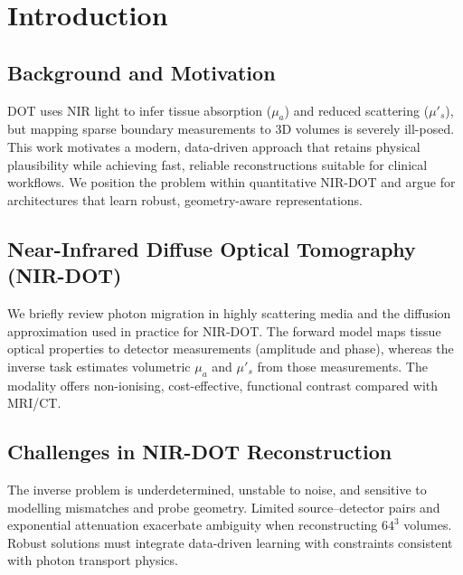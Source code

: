 
\chapter{Introduction}

\section{Background and Motivation}

DOT uses NIR light to infer tissue absorption ($\mu_a$) and reduced scattering ($\mu'_s$), but mapping sparse boundary measurements to 3D volumes is severely ill-posed. This work motivates a modern, data-driven approach that retains physical plausibility while achieving fast, reliable reconstructions suitable for clinical workflows. We position the problem within quantitative NIR-DOT and argue for architectures that learn robust, geometry-aware representations.

\section{Near-Infrared Diffuse Optical Tomography (NIR-DOT)}

We briefly review photon migration in highly scattering media and the diffusion approximation used in practice for NIR-DOT. The forward model maps tissue optical properties to detector measurements (amplitude and phase), whereas the inverse task estimates volumetric $\mu_a$ and $\mu'_s$ from those measurements. The modality offers non-ionising, cost-effective, functional contrast compared with MRI/CT.

\section{Challenges in NIR-DOT Reconstruction}

The inverse problem is underdetermined, unstable to noise, and sensitive to modelling mismatches and probe geometry. Limited source–detector pairs and exponential attenuation exacerbate ambiguity when reconstructing $64^3$ volumes. Robust solutions must integrate data-driven learning with constraints consistent with photon transport physics.

